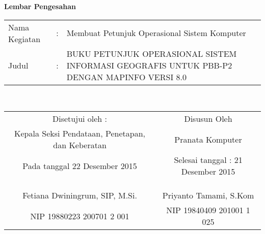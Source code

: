 \begin{center}
{\huge \bfseries Lembar Pengesahan}\\[0.4cm]

\begin{tabular}{l c p{10cm}}
  Nama Kegiatan & : & Membuat Petunjuk Operasional Sistem Komputer \\
  Judul & : & BUKU PETUNJUK OPERASIONAL SISTEM INFORMASI GEOGRAFIS UNTUK PBB-P2 DENGAN MAPINFO VERSI 8.0 \\
\end{tabular}\\[2cm]

\begin{tabular}{c c}
  Disetujui oleh : & Disusun Oleh \\
  Kepala Seksi Pendataan, Penetapan, dan Keberatan & Pranata Komputer \\
  Pada tanggal 22 Desember 2015 & Selesai tanggal : 21 Desember 2015 \\
  & \\
  & \\
  & \\
  Fetiana Dwiningrum, SIP, M.Si. & Priyanto Tamami, S.Kom \\
  NIP 19880223 200701 2 001 & NIP 19840409 201001 1 025
\end{tabular}

\end{center}